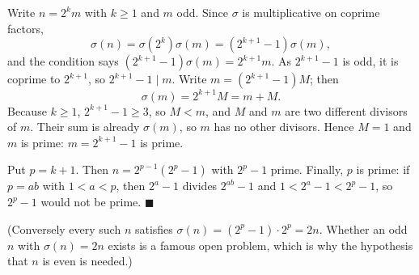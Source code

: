 Write $n=2^km$ with $k\ge1$ and $m$ odd. Since $\sigma$ is multiplicative on coprime factors,
\[\sigma(n)=\sigma(2^k)\sigma(m)=(2^{k+1}-1)\sigma(m),\]
and the condition says $(2^{k+1}-1)\sigma(m)=2^{k+1}m$. As $2^{k+1}-1$ is odd, it is coprime to $2^{k+1}$, so $2^{k+1}-1\mid m$. Write $m=(2^{k+1}-1)M$; then
\[\sigma(m)=2^{k+1}M=m+M.\]
Because $k\ge1$, $2^{k+1}-1\ge3$, so $M<m$, and $M$ and $m$ are two different divisors of $m$. Their sum is already $\sigma(m)$, so $m$ has no other divisors. Hence $M=1$ and $m$ is prime: $m=2^{k+1}-1$ is prime.

Put $p=k+1$. Then $n=2^{p-1}(2^p-1)$ with $2^p-1$ prime. Finally, $p$ is prime: if $p=ab$ with $1<a<p$, then $2^a-1$ divides $2^{ab}-1$ and $1<2^a-1<2^p-1$, so $2^p-1$ would not be prime. $\blacksquare$

(Conversely every such $n$ satisfies $\sigma(n)=(2^p-1)\cdot2^p=2n$. Whether an odd $n$ with $\sigma(n)=2n$ exists is a famous open problem, which is why the hypothesis that $n$ is even is needed.)
